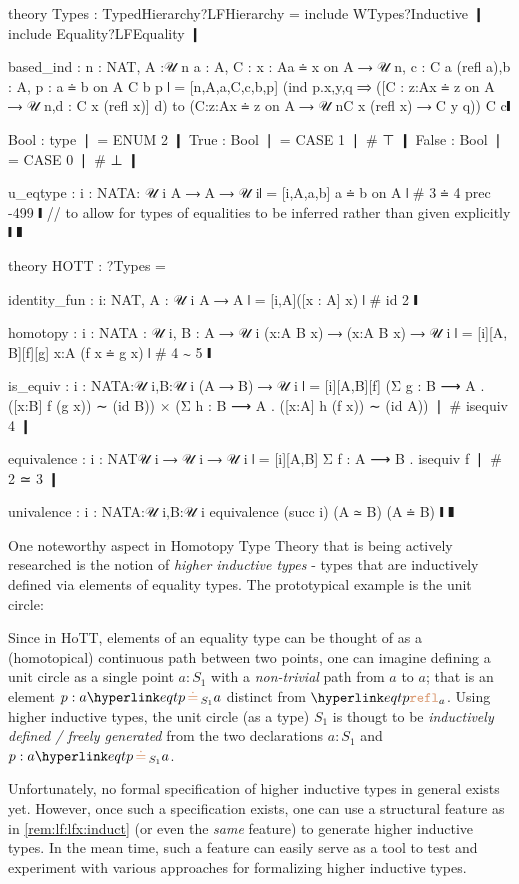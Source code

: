 \begin{mmtcode}[caption={A Theory for HOTT \protect\footnotemark},label=lst:lf:lfx:hott:implmmt]
theory Types : TypedHierarchy?LFHierarchy =
	include WTypes?Inductive ❙
	include Equality?LFEquality ❙
	
	based_ind : {n : NAT, A :𝒰 n} {a : A, C : {x : A}a ≐ x on A ⟶ 𝒰 n, c : C a (refl a),b : A,
			p : a ≐ b on A} C b p ❘
  		= [n,A,a,C,c,b,p] (ind p.x,y,q ⟹ ([C : {z:A}x ≐ z on A ⟶ 𝒰 n,d : C x (refl x)] d) 
  			to ({C:{z:A}x ≐ z on A ⟶ 𝒰 n}C x (refl x) ⟶ C y q)) C c❙
	
	Bool : type ❘ = ENUM 2 ❙
 	True : Bool ❘ = CASE 1 ❘ # ⊤ ❙
 	False : Bool ❘ = CASE 0 ❘ # ⊥ ❙
 	
 	u_eqtype : {i : NAT}{A: 𝒰 i} A ⟶ A ⟶ 𝒰 i❘ = [i,A,a,b] a ≐ b on A ❘ # 3 ≐ 4 prec -499 ❙
 	// to allow for types of equalities to be inferred rather than given explicitly ❙
❚

theory HOTT : ?Types =
	
	identity_fun : {i: NAT, A : 𝒰 i} A ⟶ A ❘ = [i,A]([x : A] x) ❘ # id 2 ❙
	
	homotopy : {i : NAT}{A : 𝒰 i, B : A ⟶ 𝒰 i} ({x:A} B x) ⟶ ({x:A} B x) ⟶ 𝒰 i ❘
		= [i][A, B][f][g] {x:A} (f x ≐ g x) ❘ # 4 ∼ 5 ❙
			
	is_equiv : {i : NAT}{A:𝒰 i,B:𝒰 i} (A ⟶ B) ⟶ 𝒰 i ❘
		= [i][A,B][f] (Σ g : B ⟶ A . ([x:B] f (g x)) ∼ (id B)) × 
			(Σ h : B ⟶ A . ([x:A] h (f x)) ∼ (id A)) ❘ # isequiv 4 ❙
	  	
	equivalence : {i : NAT}𝒰 i ⟶ 𝒰 i ⟶ 𝒰 i ❘
	  	= [i][A,B] Σ f : A ⟶ B . isequiv f ❘ # 2 ≃ 3 ❙
	  
	univalence : {i : NAT}{A:𝒰 i,B:𝒰 i} equivalence (succ i) (A ≃ B) (A ≐ B) ❙
❚
\end{mmtcode}

\begin{remark}
	One noteworthy aspect in Homotopy Type Theory that is being actively researched is the notion of \emph{higher inductive types} - types that are inductively defined via elements of equality types. The prototypical example is the unit circle:
	
	Since in HoTT, elements of an equality type can be thought of as a (homotopical) continuous path between two points, one can imagine defining a unit circle as a single point $a:S_1$ with a \emph{non-trivial} path from $a$ to $a$; that is an element $p:\eqtp aa{S_1}$ distinct from $\refl a$. Using higher inductive types, the unit circle (as a type) $S_1$ is thougt to be \emph{inductively defined / freely generated} from the two declarations $a:S_1$ and $p:\eqtp aa{S_1}$.
	
	Unfortunately, no formal specification of higher inductive types in general exists yet. However, once such a specification exists, one can use a structural feature as in \autoref{rem:lf:lfx:induct} (or even the \emph{same} feature) to generate higher inductive types. In the mean time, such a feature can easily serve as a tool to test and experiment with various approaches for formalizing higher inductive types.
\end{remark}